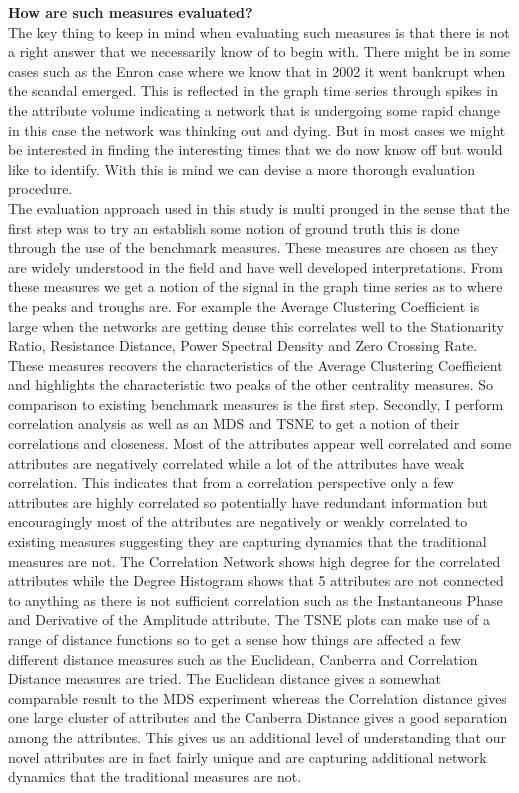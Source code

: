 \textbf{How are such measures evaluated?}\\

The key thing to keep in mind when evaluating such measures is that there is not a right answer that we necessarily know of to begin with. There might be in some cases such as the Enron case where we know that in 2002 it went bankrupt when the scandal emerged. This is reflected in the graph time series through spikes in the attribute volume indicating a network that is undergoing some rapid change in this case the network was thinking out and dying. But in most cases we might be interested in finding the interesting times that we do now know off but would like to identify. With this is mind we can devise a more thorough evaluation procedure. \\

The evaluation approach used in this study is multi pronged in the sense that the first step was to try an establish some notion of ground truth this is done through the use of the benchmark measures. These measures are chosen as they are widely understood in the field and have well developed interpretations. From these measures we get a notion of the signal in the graph time series as to where the peaks and troughs are. For example the Average Clustering Coefficient is large when the networks are getting dense this correlates well to the Stationarity Ratio, Resistance Distance, Power Spectral Density and Zero Crossing Rate. These measures recovers the characteristics of the Average Clustering Coefficient and highlights the characteristic two peaks of the other centrality measures. So comparison to existing benchmark measures is the first step. Secondly, I perform correlation analysis as well as an MDS and TSNE to get a notion of their correlations and closeness. Most of the attributes appear well correlated and some attributes are negatively correlated while a lot of the attributes have weak correlation. This indicates that from a correlation perspective only a few attributes are highly correlated so potentially have redundant information but encouragingly most of the attributes are negatively or weakly correlated to existing measures suggesting they are capturing dynamics that the traditional measures are not. The Correlation Network shows high degree for the correlated attributes while the Degree Histogram shows that 5 attributes are not connected to anything as there is not sufficient correlation such as the Instantaneous Phase and Derivative of the Amplitude attribute. The TSNE plots can make use of a range of distance functions so to get a sense how things are affected a few different distance measures such as the Euclidean, Canberra and Correlation Distance measures are tried. The Euclidean distance gives a somewhat comparable result to the MDS experiment whereas the Correlation distance gives  one large cluster of attributes and the Canberra Distance gives a good separation among the attributes. This gives us an additional level of understanding that our novel attributes are in fact fairly unique and are capturing additional network dynamics that the traditional measures are not.\\


